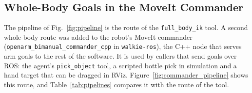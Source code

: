\documentclass[12pt,a4paper]{article}
\begin{document}
\subsection{Whole-Body Goals in the MoveIt Commander}
\label{sec:commander}

The pipeline of Fig.~\ref{fig:pipeline} is the route of the \texttt{full\_body\_ik} tool. A second
whole-body route was added to the robot's MoveIt commander (\texttt{openarm\_bimanual\_commander\_cpp}
in \texttt{walkie-ros}), the C++ node that serves arm goals to the rest of the software. It is used by
callers that send goals over ROS: the agent's \texttt{pick\_object} tool, a scripted bottle pick in
simulation and a hand target that can be dragged in RViz. Figure~\ref{fig:commander_pipeline} shows
this route, and Table~\ref{tab:pipelines} compares it with the route of the tool.
\end{document}
